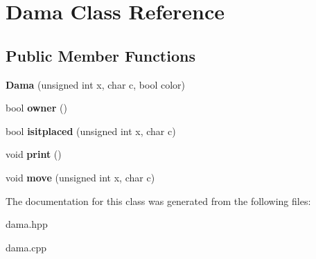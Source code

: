 \hypertarget{classDama}{\section{Dama Class Reference}
\label{classDama}
}
\subsection*{Public Member Functions}
\begin{DoxyCompactItemize}
\item 
\hypertarget{classDama_ae3bac0ae13c2c82d869d0a048b4a10fd}{{\bfseries Dama} (unsigned int x, char c, bool color)}\label{classDama_ae3bac0ae13c2c82d869d0a048b4a10fd}

\item 
\hypertarget{classDama_a948b00a3aa40c105097cf12a93589f23}{bool {\bfseries owner} ()}\label{classDama_a948b00a3aa40c105097cf12a93589f23}

\item 
\hypertarget{classDama_a4e2c346f4e72519d2c254db56b46a3ff}{bool {\bfseries isitplaced} (unsigned int x, char c)}\label{classDama_a4e2c346f4e72519d2c254db56b46a3ff}

\item 
\hypertarget{classDama_afbac92f586de02d3cd802e93e79f6f62}{void {\bfseries print} ()}\label{classDama_afbac92f586de02d3cd802e93e79f6f62}

\item 
\hypertarget{classDama_a6cd54e2a9247d00e21dae91ac32f3bba}{void {\bfseries move} (unsigned int x, char c)}\label{classDama_a6cd54e2a9247d00e21dae91ac32f3bba}

\end{DoxyCompactItemize}


The documentation for this class was generated from the following files\-:\begin{DoxyCompactItemize}
\item 
dama.\-hpp\item 
dama.\-cpp\end{DoxyCompactItemize}

